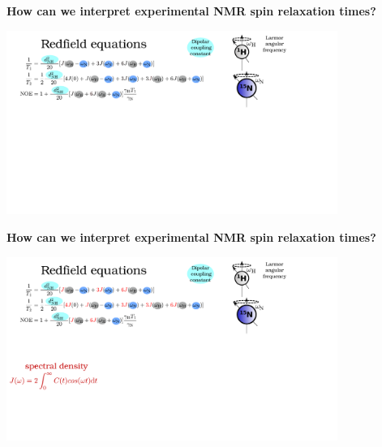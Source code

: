 \documentclass{beamer}
\begin{document}
\addtocounter{framenumber}{-1}
\begin{frame}
\begin{center}
\Large{\centering

\textbf{How can we interpret experimental NMR spin relaxation times?} \\}

\vspace{0.5cm}


\includegraphics[height=6cm]{redfield4.pdf}
\end{center}
\end{frame}


\addtocounter{framenumber}{-1}
\begin{frame}
\begin{center}
\Large{\centering

\textbf{How can we interpret experimental NMR spin relaxation times?} \\}

\vspace{0.5cm}


\includegraphics[height=6cm]{redfield5.pdf}
\end{center}
\end{frame}
\end{document}
